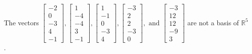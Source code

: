 \begin{exercise}
\begin{exerciseStatement}
  \end{exerciseStatement}
  \begin{exerciseAnswer}
   The vectors \(\left[\begin{array}{r}
-2 \\
0 \\
-3 \\
4 \\
-1
\end{array}\right] , \left[\begin{array}{r}
1 \\
-4 \\
-4 \\
3 \\
-1
\end{array}\right] , \left[\begin{array}{r}
1 \\
-1 \\
0 \\
-3 \\
4
\end{array}\right] , \left[\begin{array}{r}
-3 \\
2 \\
2 \\
-3 \\
0
\end{array}\right] , \text{ and } \left[\begin{array}{r}
-3 \\
12 \\
12 \\
-9 \\
3
\end{array}\right]\) 
  	 are not  a basis of \(\mathbb{R}^5\).
  


  \end{exerciseAnswer}
\end{exercise}